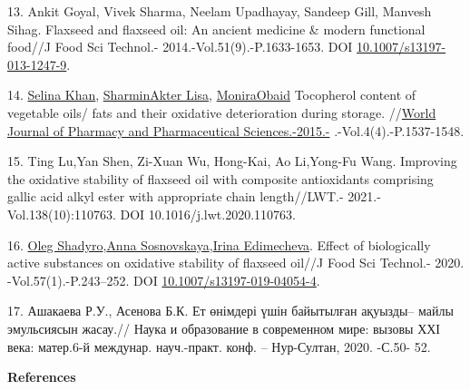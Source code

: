 \begin{refs}
13. Ankit Goyal, Vivek Sharma, Neelam Upadhayay, Sandeep Gill, Manvesh
Sihag. Flaxseed and flaxseed oil: An ancient medicine \& modern
functional food//J Food Sci Technol.- 2014.-Vol.51(9).-P.1633-1653. DOI
\href{https://doi.org/10.1007/s13197-013-1247-9}{10.1007/s13197-013-1247-9}.

14. \href{https://www.researchgate.net/scientific-contributions/Selina-Khan-2122547983?_tp=eyJjb250ZXh0Ijp7ImZpcnN0UGFnZSI6InB1YmxpY2F0aW9uIiwicGFnZSI6InB1YmxpY2F0aW9uIn19}{Selina
Khan},
\href{https://www.researchgate.net/profile/Sharmin-Lisa?_tp=eyJjb250ZXh0Ijp7ImZpcnN0UGFnZSI6InB1YmxpY2F0aW9uIiwicGFnZSI6InB1YmxpY2F0aW9uIn19}{SharminAkter
Lisa},
\href{https://www.researchgate.net/profile/Monira-Obaid?_tp=eyJjb250ZXh0Ijp7ImZpcnN0UGFnZSI6InB1YmxpY2F0aW9uIiwicGFnZSI6InB1YmxpY2F0aW9uIn19}{MoniraObaid}
Tocopherol content of vegetable oils/ fats and their oxidative
deterioration during storage.
//\href{https://www.researchgate.net/journal/World-Journal-of-Pharmacy-and-Pharmaceutical-Sciences-2278-4357?_tp=eyJjb250ZXh0Ijp7ImZpcnN0UGFnZSI6InB1YmxpY2F0aW9uIiwicGFnZSI6InB1YmxpY2F0aW9uIn19}{World
Journal of Pharmacy and Pharmaceutical Sciences.-2015.-}
.-Vol.4(4).-P.1537-1548.

15. Ting Lu,Yan Shen, Zi-Xuan Wu, Hong-Kai, Ao Li,Yong-Fu Wang.
Improving the oxidative stability of flaxseed oil with composite
antioxidants comprising gallic acid alkyl ester with appropriate chain
length//LWT.- 2021.-Vol.138(10):110763. DOI 10.1016/j.lwt.2020.110763.

16. \href{https://pubmed.ncbi.nlm.nih.gov/?term=}{Oleg
Shadyro},\href{https://pubmed.ncbi.nlm.nih.gov/?term=}{Anna
Sosnovskaya},\href{https://pubmed.ncbi.nlm.nih.gov/?term=}{Irina
Edimecheva}. Effect of biologically active substances on oxidative
stability of flaxseed oil//J Food Sci Technol.-
2020. -Vol.57(1).-P.243--252. DOI
\href{https://doi.org/10.1007/s13197-019-04054-4}{10.1007/s13197-019-04054-4}.

17. Ашакаева Р.У., Асенова Б.К. Ет өнімдері үшін байытылған ақуызды--
майлы эмульсиясын жасау.// Наука и образование в современном мире:
вызовы ХХІ века: матер.6-й междунар. науч.-практ. конф. -- Нур-Султан,
2020. -С.50- 52.
\end{refs}

\begin{center}
{\bfseries References}
\end{center}

